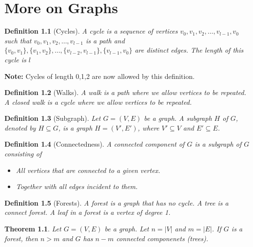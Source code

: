 \documentclass[openany]{report}
\newtheorem{theorem}{Theorem}[section]
\newtheorem{definition}{Definition}[section]
\begin{document}
\setcounter{chapter}{19}

\chapter{More on Graphs}
\begin{definition}[Cycles]
    A \emph{cycle} is a sequence of vertices $v_0, v_1,v_2, \ldots, v_{l-1}, v_0$ such that $v_0, v_1,v_2, \ldots, v_{l-1}$ is a path and $\{v_0,v_1\},\{v_1,v_2\}, \ldots,\{v_{l-2},v_{l-1}\}, \{v_{l-1}, v_0\}$ are distinct edges. The \emph{length} of this cycle is $l$
\end{definition}
\begin{center}
    \textbf{Note:} Cycles of length 0,1,2 are now allowed by this definition.
\end{center}
\begin{definition}[Walks]
    A \emph{walk} is a path where we allow vertices to be repeated. A \emph{closed walk} is a cycle where we allow vertices to be repeated.
\end{definition}
\begin{definition}[Subgraph]
    Let $G = (V,E)$ be a graph. A \emph{subgraph} $H$ of $G$, denoted by $H \subseteq G$, is a graph $H = (V', E')$, where $V' \subseteq V$ and $E' \subseteq E$.
\end{definition}
\begin{definition}[Connectedness]
    A \emph{connected component} of $G$ is a subgraph of $G$ consisting of 
    \begin{itemize}
        \item All vertices that are connected to a given vertex.
        \item Together with all edges incident to them.
    \end{itemize}
\end{definition}
\begin{definition}[Forests]
    A \emph{forest} is a graph that has no cycle. A \emph{tree} is a connect forest. A \emph{leaf} in a forest is a vertex of degree 1.
\end{definition}
\begin{theorem}
    Let $G = (V,E)$ be a graph. Let $n = |V|$ and $m = |E|$. If $G$ is a forest, then $n > m$ and $G$ has $n-m$ connected componenets (trees).
\end{theorem}
\end{document}

